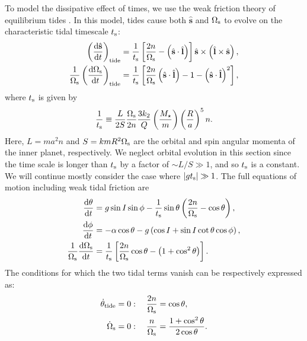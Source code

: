 \documentclass[
        fleqn,
        usenatbib,
    ]{mnras}
\newcommand*{\rd}[2]{\frac{\mathrm{d}#1}{\mathrm{d}#2}}
\newcommand*{\abs}[1]{\left|#1\right|}
\newcommand*{\p}[1]{\left(#1\right)}
\newcommand*{\s}[1]{\left[#1\right]}
\newcommand*{\uv}[1]{\hat{\mathbf{#1}}}
\begin{document}
To model the dissipative effect of times, we use the weak friction theory of
equilibrium tides \citep{lai2012}. In this model, tides cause both $\uv{s}$ and
$\Omega_{\rm s}$ to evolve on the characteristic tidal timescale $t_{\rm s}$:
\begin{align}
    \p{\rd{\uv{s}}{t}}_{\rm tide} &= \frac{1}{t_{\rm s}}
                \s{\frac{2n}{\Omega_{\rm s}} - \p{\uv{s} \cdot \uv{l}}}
                    \uv{s} \times \p{\uv{l} \times \uv{s}}\label{eq:dsdt_tide},\\
    \frac{1}{\Omega_{\rm s}}\p{\rd{\Omega_{\rm s}}{t}}_{\rm tide}
        &= \frac{1}{t_{\rm s}} \s{\frac{2n}{\Omega_{\rm s}}\p{\uv{s} \cdot
            \uv{l}} - 1 - \p{\uv{s} \cdot \uv{l}}^2},\label{eq:dWsdt_tide}
\end{align}
where $t_{\rm s}$ is given by
\begin{equation}
    \frac{1}{t_{\rm s}} \equiv \frac{L}{2S} \frac{\Omega_{\rm
        s}}{2n}\frac{3k_2}{Q}\p{\frac{M_\star}{m}}\p{\frac{R}{a}}^5 n.
\end{equation}
Here, $L = ma^2n$ and $S = kmR^2 \Omega_{\rm s}$ are the orbital and spin
angular momenta of the inner planet, respectively. We neglect orbital evolution
in this section since the time scale is longer than $t_{\rm s}$ by a factor of
$\sim L / S \gg 1$, and so $t_{\rm s}$ is a constant. We will continue mostly
consider the case where $\abs{gt_{\rm s}} \gg 1$. The full equations of motion
including weak tidal friction are
\begin{align}
    \rd{\theta}{t} &= g\sin I \sin \phi -
        \frac{1}{t_{\rm s}}\sin \theta\p{\frac{2n}{\Omega_{\rm s}} - \cos \theta}
            ,\label{eq:ds_fullq}\\
    \rd{\phi}{t} &= -\alpha\cos\theta
        - g\p{\cos I + \sin I \cot \theta \cos \phi}\label{eq:ds_fullphi},\\
    \frac{1}{\Omega_{\rm s}}\rd{\Omega_{\rm s}}{t}
        &= \frac{1}{t_{\rm s}} \s{\frac{2n}{\Omega_{\rm s}} \cos \theta
            - \p{1 + \cos^2\theta}}\label{eq:ds_fulls}.
\end{align}
The conditions for which the two tidal terms vanish can be respectively
expressed as:
\begin{align}
    \dot{\theta}_{\rm tide} = 0 &: \quad \frac{2n}{\Omega_{\rm s}} = \cos \theta,
        \label{eq:weaktide_dqzero}\\
    \dot{\Omega}_{\rm s} = 0 &: \quad \frac{n}{\Omega_{\rm s}}
        = \frac{1 + \cos^2\theta}{2\cos \theta}.\label{eq:weaktide_dWszero}
\end{align}
\end{document}
